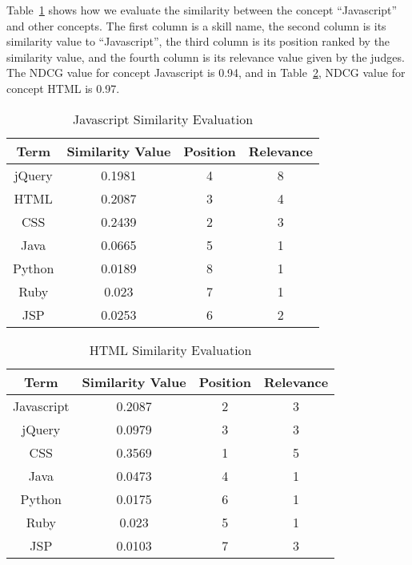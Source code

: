 Table~\ref{tab:simcompare1} shows how we evaluate the similarity between the concept ``Javascript'' and other concepts. The first column is a skill name, the second column is its similarity value to ``Javascript'', the third column is its position ranked by the similarity value, and the fourth column is its relevance value given by the judges. The NDCG value for concept Javascript is 0.94, and in Table~\ref{tab:simcompare2},  NDCG value for concept HTML is 0.97.

\begin{table}
\centering
\caption{ Javascript Similarity Evaluation }
\begin{tabular}{ | c | c | c  | c |  }
 \hline
    Term     &  Similarity Value  &  Position   & Relevance     \\  \hline
    jQuery   &  0.1981            &      4      &   8        \\
     HTML    &  0.2087            &      3      &   4         \\
     CSS     &  0.2439            &      2      &   3   \\
     Java    &  0.0665            &      5      &   1   \\
    Python   &  0.0189            &      8      &   1   \\
     Ruby    &  0.023             &      7      &   1    \\
     JSP     &  0.0253            &      6      &   2    \\
 \hline
\end{tabular}
\label{tab:simcompare1}
\end{table}


\begin{table}
\centering
\caption{ HTML Similarity Evaluation }
\begin{tabular}{ | c | c | c  | c |  }
 \hline
    Term      &  Similarity Value  &  Position   & Relevance     \\  \hline
  Javascript   &  0.2087           &      2      &   3        \\
     jQuery    &  0.0979           &      3      &   3         \\
     CSS     &  0.3569             &      1      &   5   \\
     Java    &  0.0473             &      4      &   1   \\
    Python   &  0.0175             &      6      &   1   \\
     Ruby    &  0.023              &      5      &   1    \\
     JSP     &  0.0103             &      7      &   3    \\
 \hline
\end{tabular}
\label{tab:simcompare2}
\end{table}


